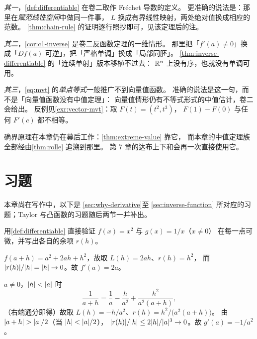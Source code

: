 \emph{其一}，\cref{def:differentiable} 在卷二取作 Fréchet 导数的定义。
更准确的说法是：那里在\emph{赋范线性空间}中做同一件事，
\(L\) 换成有界线性映射，两处绝对值换成相应的范数。
\cref{thm:chain-rule} 的证明逐行照抄即可，见该定理后的注。

\emph{其二}，\cref{cor:c1-inverse} 是卷二反函数定理的一维情形。
那里把「\(f'(a) \neq 0\)」换成「\(Df(a)\) 可逆」，把「严格单调」换成「局部同胚」。
\cref{thm:inverse-differentiable} 的「连续单射」版本移植不过去：
\(\mathbb{R}^{n}\) 上没有序，也就没有单调可用。

\emph{其三}，\cref{eq:mvt} 的\emph{单点等式}一般推广不到向量值函数。
准确的说法是这一句，而不是「向量值函数没有中值定理」：
向量值情形仍有不等式形式的中值估计，卷二会给出。
反例见\cref{exr:vector-mvt}：取 \(F(t)=(t^{2},t^{3})\)，
\(F(1)-F(0)\) 与任何 \(F'(c)\) 都不相等。

\begin{remark}
  确界原理在本章仍在幕后工作：\cref{thm:extreme-value} 靠它，
  而本章的中值定理族全部经由\cref{thm:rolle} 追溯到那里。
  第 7 章的达布上下和会再一次直接使用它。
\end{remark}

\section*{习题}

本章尚在写作中，以下是 \cref{sec:why-derivative}至 \cref{sec:inverse-function}
所对应的习题；Taylor 与凸函数的习题随后两节一并补出。

\begin{exercise}[例行]
  \label{exr:linear-approx-direct}
  用\cref{def:differentiable} 直接验证 \(f(x)=x^{2}\) 与 \(g(x)=1/x\)（\(x \neq 0\)）
  在每一点可微，并写出各自的余项 \(r(h)\)。
  \begin{solution}
    \(f(a+h) = a^{2} + 2ah + h^{2}\)，故取 \(L(h)=2ah\)、\(r(h)=h^{2}\)，
    而 \(\lvert r(h)\rvert/\lvert h\rvert = \lvert h\rvert \to 0\)。故 \(f'(a)=2a\)。

    \(a \neq 0\)，\(\lvert h\rvert<\lvert a\rvert\) 时
    \[
      \frac{1}{a+h} = \frac{1}{a} - \frac{h}{a^{2}} + \frac{h^{2}}{a^{2}(a+h)} ,
    \]
    （右端通分即得）故取 \(L(h) = -h/a^{2}\)、\(r(h) = h^{2}/\bigl(a^{2}(a+h)\bigr)\)。
    由 \(\lvert a+h\rvert > \lvert a\rvert/2\)（当 \(\lvert h\rvert<\lvert a\rvert/2\)），
    \(\lvert r(h)\rvert/\lvert h\rvert \le 2\lvert h\rvert/\lvert a\rvert^{3} \to 0\)。故 \(g'(a)=-1/a^{2}\)。
  \end{solution}
\end{exercise}

